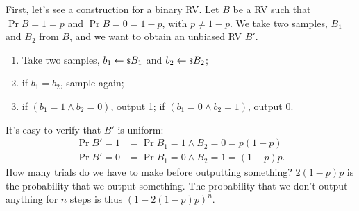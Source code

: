First, let's see a construction for a binary \ac{RV}.
Let $B$ be a \ac{RV} such that $\Pr{B = 1} = p$ and $\Pr{B = 0} = 1-p$, with $p \neq 1-p$.
We take two samples, $B_1$ and $B_2$ from $B$, and we want to obtain an unbiased \ac{RV} $B'$.
\begin{enumerate}
	\item Take two samples, $b_1 \leftarrow {\scriptstyle \$} {B_1}$ and $b_2 \leftarrow {\scriptstyle \$} {B_2}$;
	\item if $b_1 = b_2$, sample again;
	\item if $(b_1 = 1 \land b_2 = 0)$, output 1; if $(b_1 = 0 \land b_2 = 1)$, output 0.
\end{enumerate}
It's easy to verify that $B'$ is uniform:
\begin{align*}
	\Pr{B' = 1} & = \Pr{B_1 = 1 \land B_2 = 0} = p (1-p) \\
	\Pr{B' = 0} & = \Pr{B_1 = 0 \land B_2 = 1} = (1-p) p.
\end{align*}
How many trials do we have to make before outputting something?
$2(1-p)p$ is the probability that we output something.
The probability that we don't output anything for $n$ steps is thus $(1 - 2(1-p)p)^n$.

